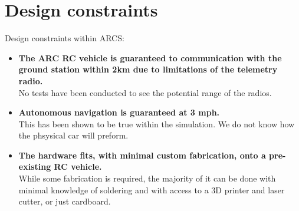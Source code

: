 \documentclass[compsoc,draftclsnofoot,onecolumn,10pt]{IEEEtran}
\begin{document}
\section{Design constraints}
Design constraints within ARCS:
\begin{itemize}
	\item \textbf{The ARC RC vehicle is guaranteed to communication with the ground station within 2km due to limitations of the telemetry radio.}
	\\ No tests have been conducted to see the potential range of the radios. 
	
	\item \textbf{Autonomous navigation is guaranteed at 3 mph.}
	\\ This has been shown to be true within the simulation. We do not know how the phsysical car will preform. 
	
	\item \textbf{The hardware fits, with minimal custom fabrication, onto a pre-existing RC vehicle.}
	\\ While some fabrication is required, the majority of it can be done with minimal knowledge of soldering and with access to a 3D printer and laser cutter, or just cardboard. 
\end{itemize}
\end{document}

